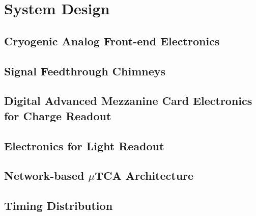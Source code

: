 \section{System Design}
\label{sec:dp-tpcelec-design}

\subsection{Cryogenic Analog Front-end Electronics}
\label{ssec:dp-tpcelec-design-cryofe}

\subsection{Signal Feedthrough Chimneys}
\label{ssec:dp-tpcelec-design-sft}

\subsection{Digital Advanced Mezzanine Card Electronics for Charge Readout}
\label{ssec:dp-tpcelec-design-amc}

\subsection{Electronics for Light Readout}
\label{ssec:dp-tpcelec-design-lro}

\subsection{Network-based $\mu$TCA Architecture}
\label{ssec:dp-tpcelec-design-utca}

\subsection{Timing Distribution}
\label{ssec:dp-tpcelec-wr}
